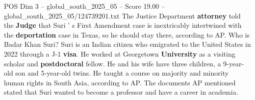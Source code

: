 \begin{textsample}{POS Dim 3 – global\_south\_2025\_05 – Score 19.00 – global\_south\_2025\_05/124739201.txt}
The Justice Department \textbf{attorney} told the \textbf{Judge} that Suri ' s First Amendment case is inextricably intertwined with the \textbf{deportation} case in Texas, so he should stay there, according to AP.
Who is Badar Khan Suri?
Suri is an Indian citizen who emigrated to the United States in 2022 through a J-1 \textbf{visa}.
He worked at Georgetown \textbf{University} as a visiting scholar and \textbf{postdoctoral} fellow.
He and his wife have three children, a 9-year-old son and 5-year-old twins.
He taught a course on majority and minority human rights in South Asia, according to AP.
The documents AP mentioned stated that Suri wanted to become a professor and have a career in academia.

\end{textsample}
